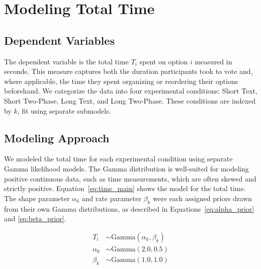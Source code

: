 \section{Modeling Total Time} \label{sec:apdx:model_time}

\subsection{Dependent Variables} The dependent variable is the total time $T_i$ spent on option $i$ measured in seconds. This measure captures both the duration participants took to vote and, where applicable, the time they spent organizing or reordering their options beforehand. We categorize the data into four experimental conditions: Short Text, Short Two-Phase, Long Text, and Long Two-Phase. These conditions are indexed by $k$, fit using separate submodels.

\subsection{Modeling Approach} We modeled the total time for each experimental condition using separate Gamma likelihood models. The Gamma distribution is well-suited for modeling positive continuous data, such as time measurements, which are often skewed and strictly positive. Equation~\ref{eq:time_main} shows the model for the total time. The shape parameter $\alpha_k$ and rate parameter $\beta_k$ were each assigned priors drawn from their own Gamma distributions, as described in Equations~\ref{eq:alpha_prior} and \ref{eq:beta_prior}.

\begin{align}
    T_i &\sim \text{Gamma}(\alpha_k, \beta_k) \label{eq:time_main} \\
    \alpha_k &\sim \text{Gamma}(2.0, 0.5) \label{eq:alpha_prior} \\
    \beta_k &\sim \text{Gamma}(1.0, 1.0) \label{eq:beta_prior}
\end{align}